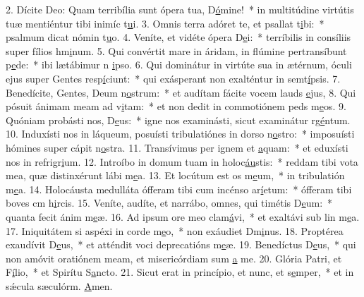 2. Dícite Deo: Quam terribília sunt ópera tua, D\uline{ó}mine!~* in multitúdine virtútis tuæ mentiéntur tibi inimíc t\uline{u}i.
3. Omnis terra adóret te, et psallat t\uline{i}bi:~* psalmum dicat nómin t\uline{u}o.
4. Veníte, et vidéte ópera D\uline{e}i:~* terríbilis in consíliis super fílios hm\uline{i}num.
5. Qui convértit mare in áridam, in flúmine pertransíbunt p\uline{e}de:~* ibi lætábimur n \uline{i}pso.
6. Qui dominátur in virtúte sua in ætérnum, óculi ejus super Gentes resp\uline{í}ciunt:~* qui exásperant non exalténtur in semt\uline{í}psis.
7. Benedícite, Gentes, Deum n\uline{o}strum:~* et audítam fácite vocem lauds \uline{e}jus,
8. Qui pósuit ánimam meam ad v\uline{i}tam:~* et non dedit in commotiónem peds m\uline{e}os.
9. Quóniam probásti nos, D\uline{e}us:~* igne nos examinásti, sicut examinátur rg\uline{é}ntum.
10. Induxísti nos in láqueum, posuísti tribulatiónes in dorso n\uline{o}stro:~* imposuísti hómines super cápit n\uline{o}stra.
11. Transívimus per ignem et \uline{a}quam:~* et eduxísti nos in refrigr\uline{i}um.
12. Introíbo in domum tuam in holoc\uline{áu}stis:~* reddam tibi vota mea, quæ distinxérunt lábi m\uline{e}a.
13. Et locútum est os m\uline{e}um,~* in tribulatión m\uline{e}a.
14. Holocáusta medulláta ófferam tibi cum incénso ar\uline{í}etum:~* ófferam tibi boves cm h\uline{i}rcis.
15. Veníte, audíte, et narrábo, omnes, qui timétis D\uline{e}um:~* quanta fecit ánim m\uline{e}æ.
16. Ad ipsum ore meo clam\uline{á}vi,~* et exaltávi sub lin m\uline{e}a.
17. Iniquitátem si aspéxi in corde m\uline{e}o,~* non exáudiet Dm\uline{i}nus.
18. Proptérea exaudívit D\uline{e}us,~* et atténdit voci deprecatións m\uline{e}æ.
19. Benedíctus D\uline{e}us,~* qui non amóvit oratiónem meam, et misericórdiam sum \uline{a} me.
20. Glória Patri, et F\uline{í}lio,~* et Spirítu S\uline{a}ncto.
21. Sicut erat in princípio, et nunc, et s\uline{e}mper,~* et in sǽcula sæculórm. \uline{A}men.
